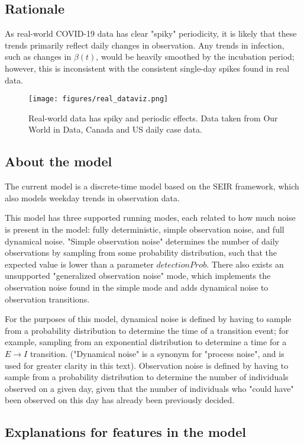 \documentclass{article}
\begin{document}
\subsection{Rationale}
As real-world COVID-19 data has clear "spiky" periodicity, it is likely that these trends primarily reflect daily changes in observation. Any trends in infection, such as changes in $\beta(t)$, would be heavily smoothed by the incubation period; however, this is inconsistent with the consistent single-day spikes found in real data. 

\clearpage
\begin{figure}
    \centering
    \texttt{[image: figures/real\_dataviz.png]}
    \caption{Real-world data has spiky and periodic effects. Data taken from Our World in Data, Canada and US daily case data.}
    \label{fig:my_label}
\end{figure}


\subsection{About the model}
The current model is a discrete-time model based on the SEIR framework, which also models weekday trends in observation data. 

This model has three supported running modes, each related to how much noise is present in the model: fully deterministic, simple observation noise, and full dynamical noise. "Simple observation noise" determines the number of daily observations by sampling from some probability distribution, such that the expected value is lower than a parameter $detectionProb$. There also exists an unsupported "generalized observation noise" mode, which implements the observation noise found in the simple mode and adds dynamical noise to observation transitions.

For the purposes of this model, dynamical noise is defined by having to sample from a probability distribution to determine the time of a transition event; for example, sampling from an exponential distribution to determine a time for a $E \rightarrow I$ transition. ("Dynamical noise" is a synonym for "process noise", and is used for greater clarity in this text). Observation noise is defined by having to sample from a probability distribution to determine the number of individuals observed on a given day, given that the number of individuals who "could have" been observed on this day has already been previously decided.

\subsection{Explanations for features in the model}
\end{document}
